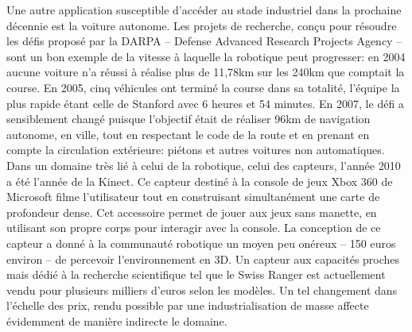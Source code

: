 Une autre application susceptible d'accéder au stade industriel dans
la prochaine décennie est la voiture autonome. Les projets de
recherche, conçu pour résoudre les défis proposé par la DARPA --
Defense Advanced Research Projects Agency -- sont un bon exemple de la
vitesse à laquelle la robotique peut progresser: en 2004 aucune
voiture n'a réussi à réalise plus de 11,78km sur les 240km que
comptait la course. En 2005, cinq véhicules ont terminé la course dans
sa totalité, l'équipe la plus rapide étant celle de Stanford avec 6
heures et 54 minutes. En 2007, le défi a sensiblement changé puisque
l'objectif était de réaliser 96km de navigation autonome, en ville,
tout en respectant le code de la route et en prenant en compte la
circulation extérieure: piétons et autres voitures non
automatiques. Dans un domaine très lié à celui de la robotique, celui
des capteurs, l'année 2010 a été l'année de la Kinect. Ce capteur
destiné à la console de jeux Xbox 360 de Microsoft filme l'utilisateur
tout en construisant simultanément une carte de profondeur dense. Cet
accessoire permet de jouer aux jeux sans manette, en utilisant son
propre corps pour interagir avec la console. La conception de ce
capteur a donné à la communauté robotique un moyen peu onéreux -- 150
euros environ -- de percevoir l'environnement en 3D. Un capteur aux
capacités proches mais dédié à la recherche scientifique tel que le
Swiss Ranger est actuellement vendu pour plusieurs milliers d'euros
selon les modèles. Un tel changement dans l'échelle des prix, rendu
possible par une industrialisation de masse affecte évidemment de
manière indirecte le domaine.


